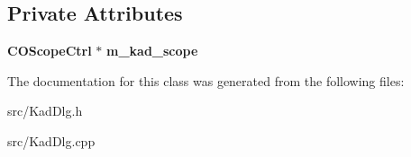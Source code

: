 \subsection*{Private Attributes}
\begin{DoxyCompactItemize}
\item 
{\bf COScopeCtrl} $\ast$ {\bfseries m\_\-kad\_\-scope}\label{classCKadDlg_ae8feec1d193acd5769d75bc609008a4c}

\end{DoxyCompactItemize}


The documentation for this class was generated from the following files:\begin{DoxyCompactItemize}
\item 
src/KadDlg.h\item 
src/KadDlg.cpp\end{DoxyCompactItemize}
